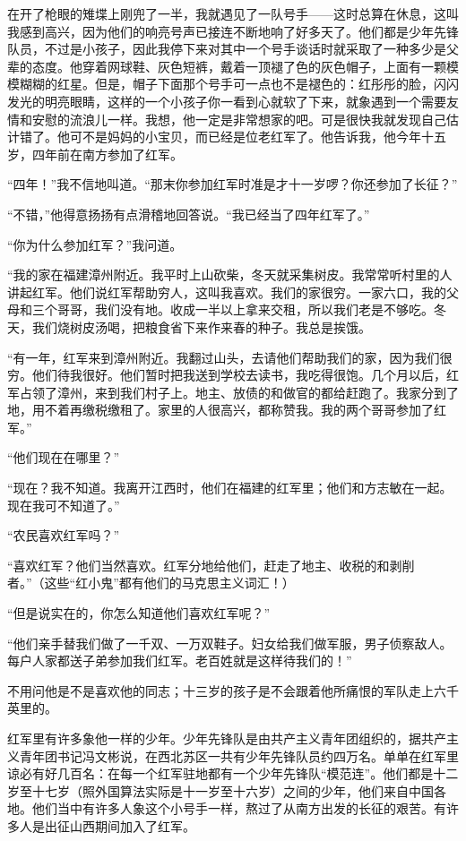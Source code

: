 \documentclass[10pt]{book}
\begin{document}
在开了枪眼的雉堞上刚兜了一半，我就遇见了一队号手——这时总算在休息，这叫我感到高兴，因为他们的响亮号声已接连不断地响了好多天了。他们都是少年先锋队员，不过是小孩子，因此我停下来对其中一个号手谈话时就采取了一种多少是父辈的态度。他穿着网球鞋、灰色短裤，戴着一顶褪了色的灰色帽子，上面有一颗模模糊糊的红星。但是，帽子下面那个号手可一点也不是褪色的：红彤彤的脸，闪闪发光的明亮眼睛，这样的一个小孩子你一看到心就软了下来，就象遇到一个需要友情和安慰的流浪儿一样。我想，他一定是非常想家的吧。可是很快我就发现自己估计错了。他可不是妈妈的小宝贝，而已经是位老红军了。他告诉我，他今年十五岁，四年前在南方参加了红军。

“四年！”我不信地叫道。“那末你参加红军时准是才十一岁啰？你还参加了长征？”

“不错，”他得意扬扬有点滑稽地回答说。“我已经当了四年红军了。”

“你为什么参加红军？”我问道。

“我的家在福建漳州附近。我平时上山砍柴，冬天就采集树皮。我常常听村里的人讲起红军。他们说红军帮助穷人，这叫我喜欢。我们的家很穷。一家六口，我的父母和三个哥哥，我们没有地。收成一半以上拿来交租，所以我们老是不够吃。冬天，我们烧树皮汤喝，把粮食省下来作来春的种子。我总是挨饿。

“有一年，红军来到漳州附近。我翻过山头，去请他们帮助我们的家，因为我们很穷。他们待我很好。他们暂时把我送到学校去读书，我吃得很饱。几个月以后，红军占领了漳州，来到我们村子上。地主、放债的和做官的都给赶跑了。我家分到了地，用不着再缴税缴租了。家里的人很高兴，都称赞我。我的两个哥哥参加了红军。”

“他们现在在哪里？”

“现在？我不知道。我离开江西时，他们在福建的红军里；他们和方志敏在一起。现在我可不知道了。”

“农民喜欢红军吗？”

“喜欢红军？他们当然喜欢。红军分地给他们，赶走了地主、收税的和剥削者。”（这些“红小鬼”都有他们的马克思主义词汇！）

“但是说实在的，你怎么知道他们喜欢红军呢？”

“他们亲手替我们做了一千双、一万双鞋子。妇女给我们做军服，男子侦察敌人。每户人家都送子弟参加我们红军。老百姓就是这样待我们的！”

不用问他是不是喜欢他的同志；十三岁的孩子是不会跟着他所痛恨的军队走上六千英里的。

红军里有许多象他一样的少年。少年先锋队是由共产主义青年团组织的，据共产主义青年团书记冯文彬说，在西北苏区一共有少年先锋队员约四万名。单单在红军里谅必有好几百名：在每一个红军驻地都有一个少年先锋队“模范连”。他们都是十二岁至十七岁（照外国算法实际是十一岁至十六岁）之间的少年，他们来自中国各地。他们当中有许多人象这个小号手一样，熬过了从南方出发的长征的艰苦。有许多人是出征山西期间加入了红军。
\end{document}
